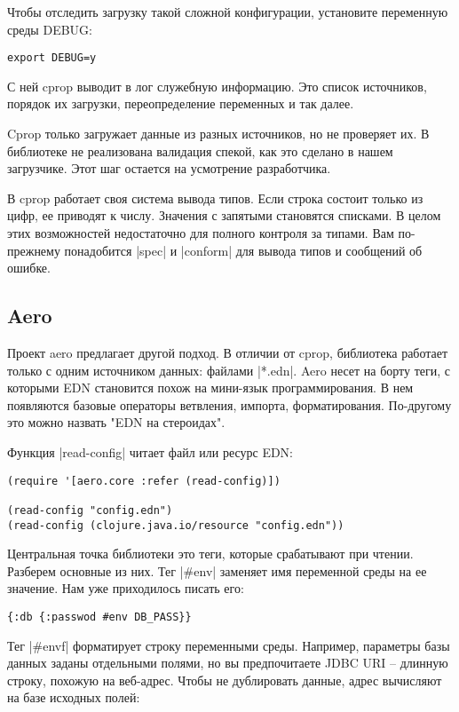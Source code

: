Чтобы отследить загрузку такой сложной конфигурации, установите переменную среды
DEBUG:

\begin{verbatim}
export DEBUG=y
\end{verbatim}

С ней cprop выводит в лог служебную информацию. Это список источников, порядок
их загрузки, переопределение переменных и так далее.

Cprop только загружает данные из разных источников, но не проверяет их. В
библиотеке не реализована валидация спекой, как это сделано в нашем
загрузчике. Этот шаг остается на усмотрение разработчика.

В cprop работает своя система вывода типов. Если строка состоит только из цифр,
ее приводят к числу. Значения с запятыми становятся списками. В целом этих
возможностей недостаточно для полного контроля за типами. Вам по-прежнему
понадобится \spverb|spec| и \spverb|conform| для вывода типов и сообщений об ошибке.

\subsection{Aero}

Проект aero предлагает другой подход. В отличии от cprop, библиотека работает
только с одним источником данных: файлами \spverb|*.edn|. Aero несет на борту теги, с
которыми EDN становится похож на мини-язык программирования. В нем появляются
базовые операторы ветвления, импорта, форматирования. По-другому это можно
назвать "EDN на стероидах".

Функция \spverb|read-config| читает файл или ресурс EDN:

\begin{verbatim}
(require '[aero.core :refer (read-config)])

(read-config "config.edn")
(read-config (clojure.java.io/resource "config.edn"))
\end{verbatim}

Центральная точка библиотеки это теги, которые срабатывают при чтении. Разберем
основные из них. Тег \spverb|#env| заменяет имя переменной среды на ее значение. Нам
уже приходилось писать его:

\begin{verbatim}
{:db {:passwod #env DB_PASS}}
\end{verbatim}

Тег \spverb|#envf| форматирует строку переменными среды. Например, параметры базы
данных заданы отдельными полями, но вы предпочитаете JDBC URI -- длинную строку,
похожую на веб-адрес. Чтобы не дублировать данные, адрес вычисляют на базе
исходных полей:

